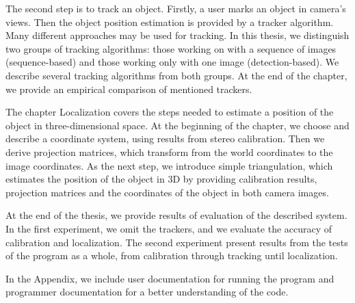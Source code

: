 The second step is to track an object. Firstly, a user marks an object in
camera's views. Then the object position estimation is provided by a tracker
algorithm. Many different approaches may be used for tracking. In this thesis,
we distinguish two groups of tracking algorithms: those working on with a
sequence of images (sequence-based) and those working only with one image
(detection-based). We describe several tracking algorithms from both groups. At
the end of the chapter, we provide an empirical comparison of mentioned
trackers.

The chapter Localization covers the steps needed to estimate a position of the
object in three-dimensional space. At the beginning of the chapter, we choose
and describe a coordinate system, using results from stereo calibration. Then
we derive projection matrices, which transform from the world coordinates to
the image coordinates. As the next step, we introduce simple triangulation,
which estimates the position of the object in 3D by providing calibration
results, projection matrices and the coordinates of the object in both camera
images.

At the end of the thesis, we provide results of evaluation of the described
system. In the first experiment, we omit the trackers, and we evaluate the
accuracy of calibration and localization. The second experiment present results
from the tests of the program as a whole, from calibration through tracking
until localization.


In the Appendix, we include user documentation for running the program and
programmer documentation for a better understanding of the code.
